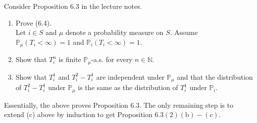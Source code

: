 \documentclass{Class}
\begin{document}
Consider Proposition 6.3 in the lecture notes.
\begin{enumerate}
    \item Prove (6.4).
    \vspace{10pt}
    \\Let $i \in S$ and $\mu$ denote a probability measure on $S$. Assume $\mathbb{P}_\mu\left(T_i<\infty\right)=1$ and $\mathbb{P}_i\left(T_i<\infty\right)=1$.
    \item Show that $T_i^n$ is finite $\mathbb{P}_\mu$-a.s. for every $n \in \mathbb{N}$.
    \item Show that $T_i^1$ and $T_i^2-T_i^1$ are independent under $\mathbb{P}_\mu$ and that the distribution of $T_i^2-T_i^1$ under $\mathbb{P}_\mu$ is the same as the distribution of $T_i^1$ under $\mathbb{P}_i$.

\end{enumerate}
Essentially, the above proves Proposition 6.3. The only remaining step is to extend (c) above by induction to get Proposition $6.3(2)(\mathrm{b})-(\mathrm{c})$.
\solution
\end{document}
